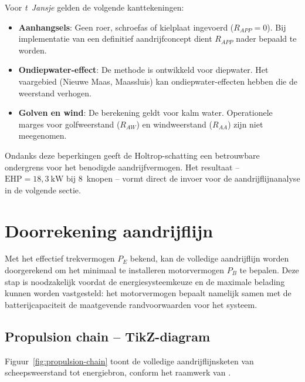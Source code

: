 Voor \emph{t~Jansje} gelden de volgende kanttekeningen:
 
\begin{itemize}
    \item \textbf{Aanhangsels}: Geen roer, schroefas of kielplaat ingevoerd ($R_{APP} = 0$).
          Bij implementatie van een definitief aandrijfconcept dient $R_{APP}$ nader bepaald
          te worden.
    \item \textbf{Ondiepwater-effect}: De methode is ontwikkeld voor diepwater. Het vaargebied
          (Nieuwe Maas, Maassluis) kan ondiepwater-effecten hebben die de weerstand verhogen.
    \item \textbf{Golven en wind}: De berekening geldt voor kalm water. Operationele marges
          voor golfweerstand ($R_{AW}$) en windweerstand ($R_{AA}$) zijn niet meegenomen.
\end{itemize}
 
Ondanks deze beperkingen geeft de Holtrop-schatting een betrouwbare ondergrens voor het
benodigde aandrijfvermogen. Het resultaat – $\mathrm{EHP} = 18{,}3\ \mathrm{kW}$ bij
8~knopen – vormt direct de invoer voor de aandrijflijnanalyse in de volgende sectie.
 
\section{Doorrekening aandrijflijn}
\label{sec:aandrijflijn}
 
Met het effectief trekvermogen $P_E$ bekend, kan de volledige aandrijflijn worden doorgerekend
om het minimaal te installeren motorvermogen $P_B$ te bepalen. Deze stap is noodzakelijk
voordat de energiesysteemkeuze en de maximale belading kunnen worden vastgesteld: het
motorvermogen bepaalt namelijk samen met de batterijcapaciteit de maatgevende randvoorwaarden
voor het systeem.
 
\subsection{Propulsion chain – TikZ-diagram}
\label{subsec:propulsion-chain}
 
Figuur~\ref{fig:propulsion-chain} toont de volledige aandrijflijnsketen van scheepsweerstand
tot energiebron, conform het raamwerk van \cite{Molland2011}.
 
